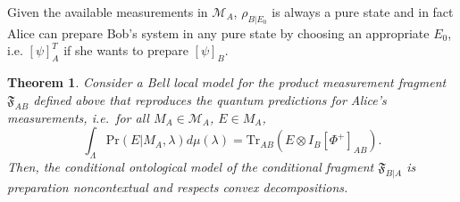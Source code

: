 \documentclass[DIV=calc,fontsize=12pt]{scrartcl} %
\theoremstyle{definition}
\theoremstyle{plain}
\newtheorem{theorem}[definition]{Theorem}
\newcommand{\Proj}[1]{\ensuremath{\left [ #1 \right ]}}
\begin{document}
Given the available measurements in $\mathcal{M}_A$, $\rho_{B|E_0}$ is
always a pure state and in fact Alice can prepare Bob's system in any
pure state by choosing an appropriate $E_0$, i.e. $\Proj{\psi}^T_A$ if
she wants to prepare $\Proj{\psi}_B$.

\begin{theorem}
\label{prop:Bell:PNC}
Consider a Bell local model for the product measurement fragment
$\mathfrak{F}_{AB}$ defined above that reproduces the quantum
predictions for Alice's measurements, i.e.\ for all $M_A \in
\mathcal{M}_A$, $E \in M_A$,
\begin{equation}
\int_{\Lambda} \mathrm{Pr}(E|M_A,\lambda)d\mu(\lambda) =
\mathrm{Tr}_{AB} \left ( E \otimes I_B \Proj{\Phi^+}_{AB} \right
).
\end{equation}
Then, the conditional ontological model of the conditional fragment
$\mathfrak{F}_{B|A}$ is preparation noncontextual and respects
convex decompositions.
\end{theorem}
\end{document}
